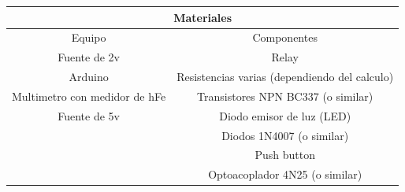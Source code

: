 \documentclass[letterpaper]{article}
\begin{document}
\newpage
\begin{large}
    \begin{table}[htbp]
        \centering
        \begin{tabular}{|c|c|}
        \hline
        \multicolumn{2}{|c|}{\textbf{Materiales}}\\ \hline
            \color{cyan}Equipo & \color{red}Componentes \\ \hline \hline
            Fuente de 2v & Relay\\ \hline 
            Arduino & Resistencias varias (dependiendo del calculo)\\ \hline 
            Multimetro con medidor de hFe & Transistores NPN BC337 (o similar)\\ \hline
            Fuente de 5v & Diodo emisor de luz (LED)\\ \hline
                & Diodos 1N4007 (o similar)\\ \hline
                & Push button\\ \hline
                & Optoacoplador 4N25 (o similar)\\ \hline
        \end{tabular}
        \label{tab:my_label}
    \end{table}
\end{large}
\end{document}
